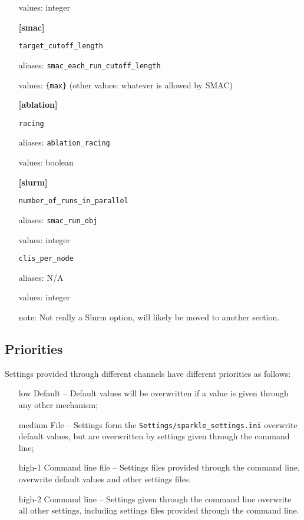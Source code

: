 \documentclass{article}
\begin{document}
\begin{itemize}[noitemsep]
          values: integer\\
  \item[] \textbf{[smac]}
  \item[] \texttt{target\_cutoff\_length}

          aliases: \texttt{smac\_each\_run\_cutoff\_length}

          values: \texttt{\{max\}} (other values: whatever is allowed by SMAC)\\
  \item[] \textbf{[ablation]}\\
  \item[] \texttt{racing}

          aliases: \texttt{ablation\_racing}

          values: boolean\\
  \item[] \textbf{[slurm]}\\
  \item[] \texttt{number\_of\_runs\_in\_parallel}

          aliases: \texttt{smac\_run\_obj}

          values: integer\\
  \item[] \texttt{clis\_per\_node}

          aliases: N/A

          values: integer

          note: Not really a Slurm option, will likely be moved to another section.\\
\end{itemize}


\subsection{Priorities}
Settings provided through different channels have different priorities as follows:

\begin{itemize}[noitemsep]
  \item[low] Default -- Default values will be overwritten if a value is given through any other mechanism;
  \item[medium] File -- Settings form the \texttt{Settings/sparkle\_settings.ini} overwrite default values, but are overwritten by settings given through the command line; 
  \item[high-1] Command line file -- Settings files provided through the command line, overwrite default values and other settings files.
  \item[high-2] Command line -- Settings given through the command line overwrite all other settings, including settings files provided through the command line.

\end{itemize}
\end{document}
